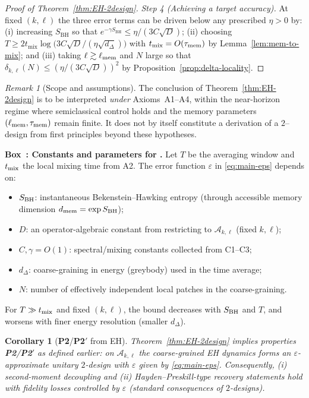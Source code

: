 \documentclass[aps,prd,preprint,onecolumn,superscriptaddress,nofootinbib,longbibliography,floatfix,11pt,showpacs,showkeys]{revtex4-2}
\newcommand{\Ptwo}{\textbf{P2}\xspace}
\newcommand{\PtwoPrime}{\textbf{P2$'$}\xspace}
\newcounter{boxedresult}
\newenvironment{boxedresult}[1]{\refstepcounter{boxedresult}\begin{infobox}\noindent\textbf{Box~\theboxedresult: #1.}}{\end{infobox}}
\theoremstyle{plain}
\newtheorem{corollary}[theorem]{Corollary}
\theoremstyle{definition}
\theoremstyle{remark}
\newtheorem{remark}[theorem]{Remark}
\begin{document}
\begin{proof}[Proof of Theorem~\ref{thm:EH-2design}]
\emph{Step 4 (Achieving a target accuracy).} At fixed $(k,\ell)$ the three error terms can be driven below any prescribed $\eta>0$ by:
(i) increasing $S_{\mathrm{BH}}$ so that $e^{-\gamma S_{\mathrm{BH}}}\le \eta/(3C\sqrt{D})$;
(ii) choosing $T\ge 2 t_{\mathrm{mix}}\log\!\big(3C\sqrt{D}/(\eta\sqrt{d_\Delta})\big)$ with $t_{\mathrm{mix}}=O(\tau_{\rm mem})$ by Lemma~\ref{lem:mem-to-mix};
and (iii) taking $\ell\gtrsim \ell_{\rm mem}$ and $N$ large so that $\delta_{k,\ell}(N)\le (\eta/(3C\sqrt{D}))^2$ by Proposition~\ref{prop:delta-locality}.
\end{proof}
\begin{remark}[Scope and assumptions]
The conclusion of Theorem~\ref{thm:EH-2design} is to be interpreted \emph{under} Axioms~A1--A4, within the near-horizon regime where semiclassical control holds and the memory parameters $(\ell_{\rm mem},\tau_{\rm mem})$ remain finite. It does not by itself constitute a derivation of a $2$--design from first principles beyond these hypotheses.
\end{remark}

\begin{boxedresult}{Constants and parameters for \Cref{thm:EH-2design}}\label{box:constants-eps-eh2}
Let $T$ be the averaging window and $t_{\rm mix}$ the local mixing time from A2. The error function $\varepsilon$ in \eqref{eq:main-eps} depends on:
\begin{itemize}[leftmargin=*,itemsep=0.2em]
  \item $S_{\rm BH}$: instantaneous Bekenstein--Hawking entropy (through accessible memory dimension $d_{\rm mem}=\exp S_{\rm BH}$);
  \item $D$: an operator-algebraic constant from restricting to $\mathscr{A}_{k,\ell}$ (fixed $k,\ell$);
  \item $C,\gamma = O(1)$: spectral/mixing constants collected from C1--C3;
  \item $d_\Delta$: coarse-graining in energy (greybody) used in the time average;
  \item $N$: number of effectively independent local patches in the coarse-graining.
\end{itemize}
For $T\gg t_{\rm mix}$ and fixed $(k,\ell)$, the bound decreases with $S_{\rm BH}$ and $T$, and worsens with finer energy resolution (smaller $d_\Delta$).
\end{boxedresult}

\begin{corollary}[\Ptwo/\PtwoPrime{} from EH]\label{cor:P2P2prime}
Theorem~\ref{thm:EH-2design} implies properties \Ptwo/\PtwoPrime{} as defined earlier: on $\mathscr{A}_{k,\ell}$ the coarse-grained EH dynamics forms an $\varepsilon$-approximate unitary $2$-design with $\varepsilon$ given by \eqref{eq:main-eps}.  Consequently, (i) second-moment decoupling and (ii) Hayden--Preskill-type recovery statements hold with fidelity losses controlled by $\varepsilon$ (standard consequences of $2$-designs).
\end{corollary}
\end{document}
